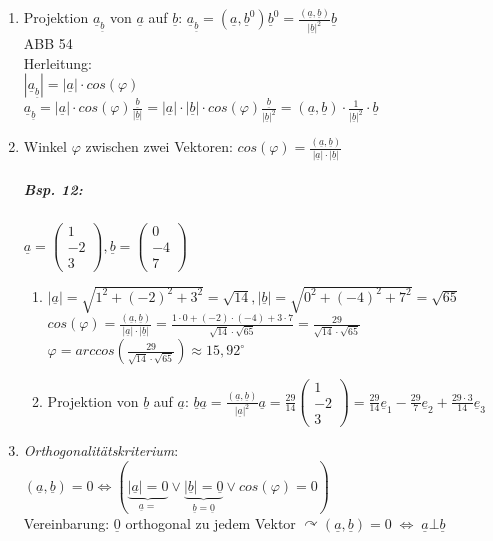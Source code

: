 \begin{enumerate}
\item Projektion $\underline{a}_{\underline{b}}$ von $\underline{a}$ auf $\underline{b}$: $\boxed{\underline{a}_{\underline{b}}=(\underline{a}, \underline{b}^0)\underline{b}^0=\frac{(\underline{a}, \underline{b})}{|\underline{b}|^2}\underline{b}}$\\
ABB 54\\
Herleitung:\\
$|\underline{a}_{\underline{b}}|=|\underline{a}|\cdot cos(\varphi)$\\
$\underline{a}_{\underline{b}}=|\underline{a}|\cdot cos(\varphi)\frac{\underline{b}}{|\underline{b}|}=|\underline{a}| \cdot |\underline{b}| \cdot cos (\varphi) \frac{\underline{b}}{|\underline{b}|^2}=(\underline{a}, \underline{b})\cdot \frac{1}{|\underline{b}|^2}\cdot \underline{b}$
\item Winkel $\varphi$ zwischen zwei Vektoren: $\boxed{cos(\varphi)=\frac{(\underline{a}, \underline{b})}{|\underline{a}|\cdot |\underline{b}|}}$
\subparagraph{Bsp. 12:} \parskp
$\underline{a}=\begin{pmatrix}
1\\
-2\\
3
\end{pmatrix}, \underline{b}=\begin{pmatrix}
0\\
-4\\
7
\end{pmatrix}$
\begin{enumerate} [label=\alph*.)]
\item $|\underline{a}| = \sqrt{1^2+(-2)^2+3^2}=\sqrt{14}, |\underline{b}|=\sqrt{0^2+(-4)^2+7^2}=\sqrt{65}$\\
$cos(\varphi)=\frac{(\underline{a}, \underline{b})}{|\underline{a}|\cdot |\underline{b}|}=\frac{1 \cdot 0 + (-2) \cdot (-4) + 3\cdot 7}{\sqrt{14} \cdot \sqrt{65}}=\frac{29}{\sqrt{14} \cdot \sqrt{65}}$\\
$\varphi=arccos\left(\frac{29}{\sqrt{14} \cdot \sqrt{65}}\right)\approx 15,92^{\circ}$
\item Projektion von $\underline{b}$ auf $\underline{a}$: $\underline{b}\underline{a}=\frac{(\underline{a}, \underline{b})}{|\underline{a}|^2}\underline{a}=\frac{29}{14}\begin{pmatrix}
1\\
-2\\
3
\end{pmatrix}=\frac{29}{14}\underline{e}_1-\frac{29}{7}\underline{e}_2+\frac{29\cdot 3}{14} \underline{e}_3$
\end{enumerate}
\item \emph{Orthogonalitätskriterium}:\\
$(\underline{a}, \underline{b})=0 \Leftrightarrow (\underbrace{|\underline{a}|=0}_{\underline{a}=} \vee \underbrace{|\underline{b}|=\underline{0}}_{\underline{b}=\underline{0}} \vee cos(\varphi)=0)$\\
Vereinbarung: $\underline{0}$ orthogonal zu jedem Vektor
$\curvearrowright \boxed{(\underline{a}, \underline{b})=0 \;\Leftrightarrow\; \underline{a} \bot \underline{b}}$


\end{enumerate}

